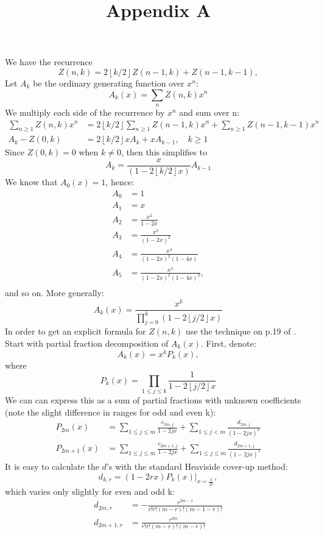 \documentclass{article}
\newcommand{\floor}[1]{\left\lfloor #1 \right\rfloor}
\begin{document}
\title{Appendix A}
\maketitle
We have the recurrence
$$
Z(n,k) = 2\floor{k/2} Z(n-1,k)+Z(n-1,k-1),
$$
Let $A_k$ be the ordinary generating function over $x^n$:
$$
A_k(x) = \sum_{n} Z(n,k) x^n
$$
We multiply each side of the recurrence by $x^n$ and sum over n:
$$
\begin{aligned}
\sum_{n \geq 1} Z(n,k)x^n &= 2\floor{k/2}\sum_{n \geq 1}Z(n-1,k)x^n + \sum_{n \geq 1} Z(n-1,k-1) x^n \\
A_k -Z(0,k)&=2\floor{k/2}x A_k+x A_{k-1}, \quad k \geq 1
\end{aligned}
$$
Since $Z(0,k) = 0$ when $k \neq 0$, then this simplifies to
$$
A_k = \frac{x}{(1-2\floor{k/2}x)} A_{k-1}
$$
We know that $A_0(x) = 1$, hence:
$$
\begin{aligned}
    A_0 &= 1 \\
    A_1 &= x \\
    A_2 &= \frac{x^2}{1-2x} \\
    A_3 &= \frac{x^3}{(1-2x)^2} \\
    A_4 &= \frac{x^4}{(1-2x)^2 (1-4x)} \\
    A_5 &= \frac{x^5}{(1-2x)^2 (1-4x)^2}, \\
\end{aligned}
$$
and so on. More generally:
$$
A_k(x) = \frac{x^k}{\prod_{j=0}^k(1-2\floor{j/2}x)}
$$
In order to get an explicit formula for $Z(n,k)$ use the technique on p.19 of \cite{wilfGeneratingfunctionologyThirdEdition2005}. Start with partial fraction decomposition of $A_k(x)$. First, denote:
$$
A_k(x) = x^kP_k(x),
$$
where
$$
P_k(x) = \prod_{1 \leq j \leq k}\frac{1}{1-2\floor{j/2}x}
$$
We can can express this as a sum of partial fractions with unknown coefficients (note the slight difference in ranges for odd and even k):
$$
\begin{aligned}
P_{2m}(x) &= \sum_{1 \leq j \leq m} \frac{c_{2m,j}}{1-2jx} + \sum_{1 \leq j < m} \frac{d_{2m,j}}{(1-2jx)^2} \\
P_{2m+1}(x) &= \sum_{1 \leq j \leq m} \frac{c_{2m+1,j}}{1-2jx} + \sum_{1 \leq j \leq m} \frac{d_{2m+1,j}}{(1-2jx)^2}
\end{aligned}
$$
It is easy to calculate the $d$'s with the standard Heaviside cover-up method:
$$
d_{k,r} = (1-2rx)P_k(x)|_{x=\frac{1}{2r}},
$$
which varies only slightly for even and odd k:
$$
\begin{aligned}
    d_{2m,r} &= -\frac{r^{2m-1}}{r!r!(m-r)!(m-1-r)!} \\
    d_{2m+1,r} &= \frac{r^{2m}}{r!r!(m-r)!(m-r)!} \\
\end{aligned}
$$
\end{document}
